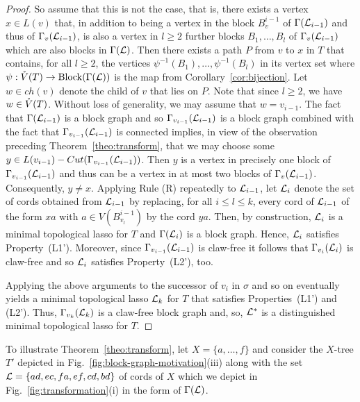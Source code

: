 \begin{proof}
  So assume that this is not the case, that is, there exists a vertex $x\in
  L(v)$ that, in addition to being a vertex in the block $B_v^{i-1}$ of
  $\Gamma({\mathcal L}_{i-1})$ and thus of $\Gamma_v({\mathcal L}_{i-1})$, is also a vertex in
  $l\geq 2$ further blocks $B_1,\ldots, B_l$ of $\Gamma_v({\mathcal L}_{i-1})$ which
  are also blocks in $\Gamma({\mathcal L})$. Then there exists a path $P$ from $v$ to
  $x$ in $T$ that contains, for all $l\geq 2$, the vertices
  $\psi^{-1}(B_1),\ldots, \psi^{-1}(B_l)$ in its vertex set where
  $\psi:\mathring{V}(T)\to \operatorname*{Block}(\Gamma({\mathcal L}))$ is the map from
  Corollary~\ref{cor:bijection}. Let $w\in ch(v)$ denote the child of $v$ that
  lies on $P$. Note that since $l\geq 2$, we have $w\in \mathring{V}(T)$. Without loss
  of generality, we may assume that $w=v_{i-1}$.  The fact that
  $\Gamma({\mathcal L}_{i-1})$ is a block graph and so $\Gamma_{v_{i-1}}({\mathcal L}_{i-1})$ is
  a block graph combined with the fact that $\Gamma_{v_{i-1}}({\mathcal L}_{i-1})$ is
  connected implies, in view of the observation preceding
  Theorem~\ref{theo:transform}, that we may choose some $y\in
  L(v_{i-1})-Cut(\Gamma_{v_{i-1}}({\mathcal L}_{i-1}))$. Then $y$ is a vertex in
  precisely one block of $\Gamma_{v_{i-1}}({\mathcal L}_{i-1})$ and thus can be a
  vertex in at most two blocks of $\Gamma_v({\mathcal L}_{i-1})$.  Consequently,
  $y\not=x$.  Applying Rule (R) repeatedly to ${\mathcal L}_{i-1}$, let ${\mathcal L}_i$ denote
  the set of cords obtained from ${\mathcal L}_{i-1}$ by replacing, for all $i\leq
  l\leq k$, every cord of ${\mathcal L}_{i-1}$ of the form $xa$ with $a\in
  V(B_{v_l}^{i-1})$ by the cord $ya$. Then, by construction, ${\mathcal L}_i$ is a
  minimal topological lasso for $T$ and $\Gamma({\mathcal L}_i)$ is a block
  graph. Hence, ${\mathcal L}_i$ satisfies Property~(L1'). Moreover, since
  $\Gamma_{v_{i-1}}({\mathcal L}_{i-1})$ is claw-free it follows that
  $\Gamma_{v_i}({\mathcal L}_i)$ is claw-free and so ${\mathcal L}_i$ satisfies Property~(L2'),
  too.

  Applying the above arguments to the successor of $v_i$ in $\sigma$ and so on
  eventually yields a minimal topological lasso ${\mathcal L}_k$ for $T$ that satisfies
  Properties~(L1') and (L2'). Thus, $\Gamma_{v_k}({\mathcal L}_k) $ is a claw-free
  block graph and, so, ${\mathcal L}^*$ is a distinguished minimal topological lasso
  for $T$.
\end{proof}

To illustrate Theorem~\ref{theo:transform}, let $X=\{a,\ldots, f\}$ and
consider the $X$-tree $T'$ depicted in
Fig.~\ref{fig:block-graph-motivation}(iii) along with the set
${\mathcal L}=\{ad,ec,fa,ef,cd,bd\}$ of cords of $X$ which we depict in
Fig.~\ref{fig:transformation}(i) in the form of $\Gamma({\mathcal L})$.

